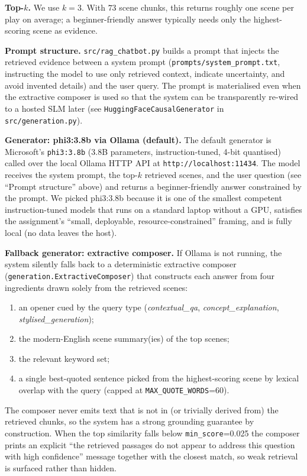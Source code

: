 \documentclass[10pt,conference]{IEEEtran}
\begin{document}
\textbf{Top-$k$.} We use $k = 3$. With $73$ scene chunks, this returns
roughly one scene per play on average; a beginner-friendly answer
typically needs only the highest-scoring scene as evidence.

\textbf{Prompt structure.} \verb|src/rag_chatbot.py| builds a prompt
that injects the retrieved evidence between a system prompt
(\verb|prompts/system_prompt.txt|, instructing the model to use only
retrieved context, indicate uncertainty, and avoid invented details)
and the user query. The prompt is materialised even when the
extractive composer is used so that the system can be transparently
re-wired to a hosted SLM later (see \verb|HuggingFaceCausalGenerator|
in \verb|src/generation.py|).

\textbf{Generator: phi3:3.8b via Ollama (default).} The default
generator is Microsoft's \texttt{phi3:3.8b} (3.8B parameters,
instruction-tuned, 4-bit quantised) called over the local Ollama HTTP
API at \verb|http://localhost:11434|. The model receives the system
prompt, the top-$k$ retrieved scenes, and the user question (see
``Prompt structure'' above) and returns a beginner-friendly answer
constrained by the prompt. We picked phi3:3.8b because it is one of
the smallest competent instruction-tuned models that runs on a
standard laptop without a GPU, satisfies the assignment's
``small, deployable, resource-constrained'' framing, and is fully
local (no data leaves the host).

\textbf{Fallback generator: extractive composer.} If Ollama is not
running, the system silently falls back to a deterministic extractive
composer (\verb|generation.ExtractiveComposer|) that constructs each
answer from four ingredients drawn solely from the retrieved scenes:

\begin{enumerate}
    \item an opener cued by the query type
        (\emph{contextual\_qa}, \emph{concept\_explanation},
        \emph{stylised\_generation});
    \item the modern-English scene summary(ies) of the top scenes;
    \item the relevant keyword set;
    \item a single best-quoted sentence picked from the highest-scoring
        scene by lexical overlap with the query (capped at
        \verb|MAX_QUOTE_WORDS|=60).
\end{enumerate}

The composer never emits text that is not in (or trivially derived
from) the retrieved chunks, so the system has a strong grounding
guarantee by construction. When the top similarity falls below
\verb|min_score|=0.025 the composer prints an explicit
``the retrieved passages do not appear to address this question with
high confidence'' message together with the closest match, so weak
retrieval is surfaced rather than hidden.
\end{document}
